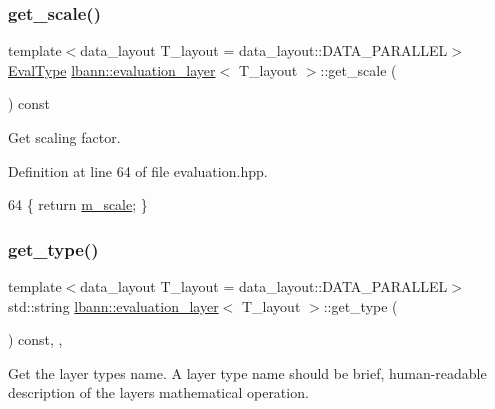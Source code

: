 \subsubsection{\texorpdfstring{get\+\_\+scale()}{get\_scale()}}
{\footnotesize\ttfamily template$<$data\+\_\+layout T\+\_\+layout = data\+\_\+layout\+::\+D\+A\+T\+A\+\_\+\+P\+A\+R\+A\+L\+L\+EL$>$ \\
\hyperlink{base_8hpp_a3266f5ac18504bbadea983c109566867}{Eval\+Type} \hyperlink{classlbann_1_1evaluation__layer}{lbann\+::evaluation\+\_\+layer}$<$ T\+\_\+layout $>$\+::get\+\_\+scale (\begin{DoxyParamCaption}{ }\end{DoxyParamCaption}) const\hspace{0.3cm}{\ttfamily [inline]}}

Get scaling factor. 

Definition at line 64 of file evaluation.\+hpp.


\begin{DoxyCode}
64 \{ \textcolor{keywordflow}{return} \hyperlink{classlbann_1_1evaluation__layer_af365bda5700dca43434b01f0a2b1ee45}{m\_scale}; \}
\end{DoxyCode}
\mbox{\label{classlbann_1_1evaluation__layer_a8762999841e8afe89a87a9c3db3da0df}} 
\subsubsection{\texorpdfstring{get\+\_\+type()}{get\_type()}}
{\footnotesize\ttfamily template$<$data\+\_\+layout T\+\_\+layout = data\+\_\+layout\+::\+D\+A\+T\+A\+\_\+\+P\+A\+R\+A\+L\+L\+EL$>$ \\
std\+::string \hyperlink{classlbann_1_1evaluation__layer}{lbann\+::evaluation\+\_\+layer}$<$ T\+\_\+layout $>$\+::get\+\_\+type (\begin{DoxyParamCaption}{ }\end{DoxyParamCaption}) const\hspace{0.3cm}{\ttfamily [inline]}, {\ttfamily [override]}, {\ttfamily [virtual]}}

Get the layer type\textquotesingle{}s name. A layer type name should be brief, human-\/readable description of the layer\textquotesingle{}s mathematical operation. 


